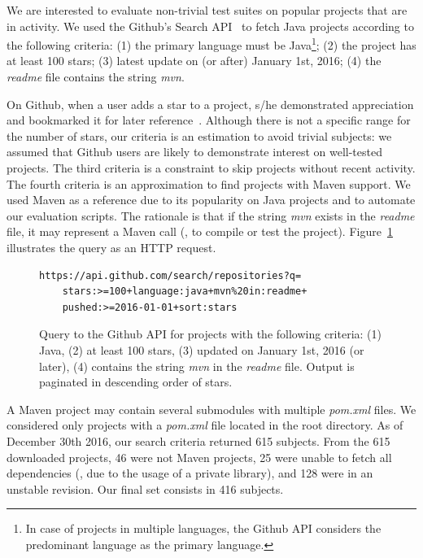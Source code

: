 We are interested to evaluate non-trivial test suites on popular
projects that are in activity. We used the Github's Search
API~\cite{githubsearch} to fetch Java projects according to the
following criteria: (1) the primary language must be Java\footnote{In
case of projects in multiple languages, the Github API considers the
predominant language as the primary language.}; (2) the project has at
least 100 stars; (3) latest update on (or after) January 1st, 2016;
(4) the \emph{readme} file contains the string \emph{mvn}.

On Github, when a user adds a star to a project, s/he demonstrated
appreciation and bookmarked it for later
reference~\cite{github-stars}.  Although there is not a specific range
for the number of stars, our criteria is an estimation to avoid
trivial subjects: we assumed that Github users are likely to
demonstrate interest on well-tested projects. The third criteria is a
constraint to skip projects without recent activity. The fourth
criteria is an approximation to find projects with Maven support. We
used Maven as a reference due to its popularity on Java projects and
to automate our evaluation scripts. The rationale is that if the
string \emph{mvn} exists in the \emph{readme} file, it may represent a
Maven call (\eg, to compile or test the project).
Figure~\ref{fig:subject-query} illustrates the query as an HTTP
request.

\begin{figure}[h!]
\centering
\scriptsize
{}
\begin{lstlisting}
https://api.github.com/search/repositories?q=
    stars:>=100+language:java+mvn%20in:readme+
    pushed:>=2016-01-01+sort:stars

\end{lstlisting}
\caption{\label{fig:subject-query} Query to the Github API for
    projects with the following criteria: (1) Java, (2) at least 100
    stars, (3) updated on January 1st, 2016 (or later), (4) contains
    the string \emph{mvn} in the \emph{readme} file. Output is
    paginated in descending order of stars.}
\end{figure}

A Maven project may contain several submodules with multiple
\emph{pom.xml} files. We considered only projects with a
\emph{pom.xml} file located in the root directory.  As of December
30th 2016, our search criteria returned 615 subjects. From the 615
downloaded projects, 46 were not Maven projects, 25 were unable to fetch
all dependencies (\eg, due to the usage of a private library), and 128
were in an unstable revision. Our final set consists in 416 subjects.

